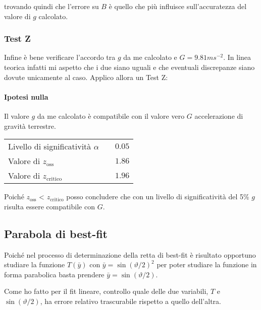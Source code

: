 \documentclass{article}
\begin{document}
	trovando quindi che l'errore su $B$ è quello che più influisce sull'accuratezza del valore di $g$ calcolato.
	\\
	
	\subsubsection{Test Z}
	Infine è bene verificare l'accordo tra $g$ da me calcolato e $G = 9.81 ms^{-2}$. In linea teorica infatti mi aspetto che i due siano uguali e che eventuali discrepanze siano dovute unicamente al caso. Applico allora un Test Z:
	
	\paragraph{Ipotesi nulla} Il valore $g$ da me calcolato è compatibile con il valore vero $G$ accelerazione di gravità terrestre.
	
	\vspace{0.7cm}
	\begin{table}[H]
		\centering
		\begin{tabular}{lr}
			Livello di significatività $\alpha$	& $\quad 0.05$  \\
			Valore di $z_\text{oss}$             	& $\quad 1.86$  \\
			Valore di $z_{\text{critico}}$ 		& $\quad 1.96$  \\ 
		\end{tabular}
	\end{table}
	\vspace{0.7cm}
	
	\noindent
	Poiché $z_\text{oss}$ < $z_{\text{critico}}$ posso concludere che con un livello di significatività del 5\% $g$ risulta essere compatibile con $G$.
	
	
	\subsection{Parabola di best-fit}
	Poiché nel processo di determinazione della retta di best-fit è risultato opportuno studiare la funzione $T(\bar{y})$ con $\bar{y} = \sin{\left( \vartheta / 2\right)}^2$ per poter studiare la funzione in forma parabolica basta prendere $\bar{y} =  \sin{\left( \vartheta / 2\right)}$.
	
	Come ho fatto per il fit lineare, controllo quale delle due variabili, $T$ e $ \sin{\left( \vartheta / 2\right)}$, ha errore relativo trascurabile rispetto a quello dell'altra.
	
\end{document}
